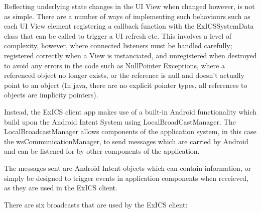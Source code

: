 Reflecting underlying state changes in the UI View when changed however, is not as simple.  There are a number of ways of implementing such behaviours such as each UI View element registering a callback function with the ExICSSystemData class that can be called to trigger a UI refresh etc.  This involves a level of complexity, however, where connected listeners must be handled carefully; registered correctly when a View is instanciated, and unregistered when destroyed to avoid any errors in the code such as NullPointer Exceptions, where a referenced object no longer exists, or the reference is null and doesn't actually point to an object (In java, there are no explicit pointer types, all references to objects are implicity pointers).

Instead, the ExICS client app makes use of a built-in Android functionality which build upon the Android Intent System using LocalBroadCastManager\cite{localBroadcastAndroid}.  The LocalBroadcastManager allows components of the application system, in this case the wsCommunicationManager, to send messages which are carried by Android and can be listened for by other components of the application.

The messages sent are Android Intent objects\cite{androidIntents} which can contain information, or simply be designed to trigger events in application components when receieved, as they are used in the ExICS client.

There are six broadcasts that are used by the ExICS client:

